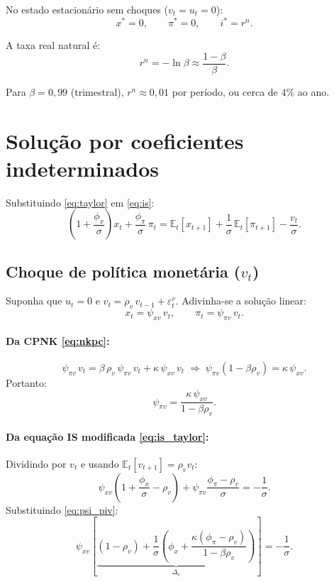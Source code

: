 \documentclass[11pt,a4paper]{article}
\newcommand{\E}{\mathbb{E}}
\begin{document}
No estado estacionário sem choques ($v_t = u_t = 0$):
\[
  x^* = 0,\qquad \pi^* = 0,\qquad i^* = r^n.
\]

A taxa real natural é:
\begin{equation}
  r^n = -\ln\beta \approx \frac{1-\beta}{\beta}.
\end{equation}

Para $\beta = 0{,}99$ (trimestral), $r^n \approx 0{,}01$ por período,
ou cerca de $4\%$ ao ano.

\section{Solução por coeficientes indeterminados}

Substituindo \eqref{eq:taylor} em \eqref{eq:is}:
\begin{equation}\label{eq:is_taylor}
  \left(1 + \frac{\phi_x}{\sigma}\right) x_t
  + \frac{\phi_\pi}{\sigma}\,\pi_t
  = \E_t[x_{t+1}] + \frac{1}{\sigma}\,\E_t[\pi_{t+1}] - \frac{v_t}{\sigma}.
\end{equation}

\subsection{Choque de política monetária ($v_t$)}

Suponha que $u_t = 0$ e $v_t = \rho_v\,v_{t-1} + \varepsilon_t^v$.
Adivinha-se a solução linear:
\[
  x_t = \psi_{xv}\,v_t, \qquad \pi_t = \psi_{\pi v}\,v_t.
\]

\paragraph{Da CPNK \eqref{eq:nkpc}:}
\[
  \psi_{\pi v}\,v_t = \beta\,\rho_v\,\psi_{\pi v}\,v_t + \kappa\,\psi_{xv}\,v_t
  \;\Longrightarrow\;
  \psi_{\pi v}(1 - \beta\rho_v) = \kappa\,\psi_{xv}.
\]
Portanto:
\begin{equation}\label{eq:psi_piv}
  \psi_{\pi v} = \frac{\kappa\,\psi_{xv}}{1-\beta\rho_v}.
\end{equation}

\paragraph{Da equação IS modificada \eqref{eq:is_taylor}:}
Dividindo por $v_t$ e usando $\E_t[v_{t+1}] = \rho_v v_t$:
\[
  \psi_{xv}\!\left(1 + \frac{\phi_x}{\sigma} - \rho_v\right)
  + \psi_{\pi v}\!\frac{\phi_\pi - \rho_v}{\sigma} = -\frac{1}{\sigma}.
\]
Substituindo \eqref{eq:psi_piv}:
\[
  \psi_{xv}\!\left[\underbrace{(1-\rho_v)
    + \frac{1}{\sigma}\!\left(\phi_x
    + \frac{\kappa(\phi_\pi-\rho_v)}{1-\beta\rho_v}\right)}_{\Delta_v}\right]
  = -\frac{1}{\sigma}.
\]
\end{document}
